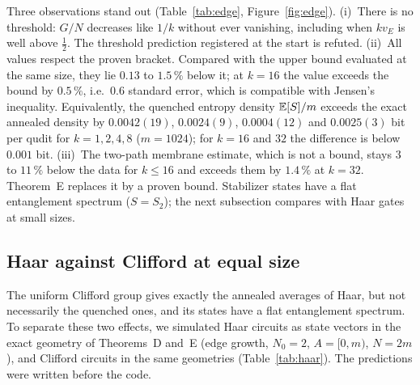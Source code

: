 Three observations stand out (Table~\ref{tab:edge}, Figure~\ref{fig:edge}).
(i)~There is no threshold: $G/N$ decreases like $1/k$ without ever vanishing, including when $kv_E$ is well above $\frac12$. The threshold prediction registered at the start is refuted.
(ii)~All values respect the proven bracket. Compared with the upper bound evaluated at the same size, they lie $0.13$ to $1.5\,\%$ below it; at $k=16$ the value exceeds the bound by $0.5\,\%$, i.e.\ $0.6$ standard error, which is compatible with Jensen's inequality. Equivalently, the quenched entropy density $\mathbb{E}[S]/m$ exceeds the exact annealed density by $0.0042(19)$, $0.0024(9)$, $0.0004(12)$ and $0.0025(3)$ bit per qudit for $k=1,2,4,8$ ($m=1024$); for $k=16$ and $32$ the difference is below $0.001$ bit.
(iii)~The two-path membrane estimate, which is not a bound, stays $3$ to $11\,\%$ below the data for $k\le16$ and exceeds them by $1.4\,\%$ at $k=32$. Theorem~E replaces it by a proven bound.
Stabilizer states have a flat entanglement spectrum ($S=S_2$); the next subsection compares with Haar gates at small sizes.

\subsection{Haar against Clifford at equal size}\label{sec:num-haar}

The uniform Clifford group gives exactly the annealed averages of Haar, but not necessarily the quenched ones, and its states have a flat entanglement spectrum. To separate these two effects, we simulated Haar circuits as state vectors in the exact geometry of Theorems~D and~E (edge growth, $N_0=2$, $A=[0,m)$, $N=2m$), and Clifford circuits in the same geometries (Table~\ref{tab:haar}). The predictions were written before the code.

